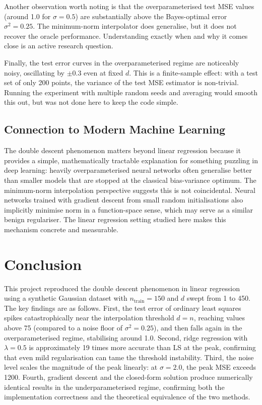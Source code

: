 \documentclass[11pt,a4paper]{article}
\begin{document}
Another observation worth noting is that the overparameterised test MSE values (around 1.0 for $\sigma = 0.5$) are substantially above the Bayes-optimal error $\sigma^2 = 0.25$. The minimum-norm interpolator does generalise, but it does not recover the oracle performance. Understanding exactly when and why it comes close is an active research question.

Finally, the test error curves in the overparameterised regime are noticeably noisy, oscillating by $\pm 0.3$ even at fixed $d$. This is a finite-sample effect: with a test set of only 200 points, the variance of the test MSE estimator is non-trivial. Running the experiment with multiple random seeds and averaging would smooth this out, but was not done here to keep the code simple.

\subsection{Connection to Modern Machine Learning}

The double descent phenomenon matters beyond linear regression because it provides a simple, mathematically tractable explanation for something puzzling in deep learning: heavily overparameterised neural networks often generalise better than smaller models that are stopped at the classical bias-variance optimum. The minimum-norm interpolation perspective suggests this is not coincidental. Neural networks trained with gradient descent from small random initialisations also implicitly minimise norm in a function-space sense, which may serve as a similar benign regulariser. The linear regression setting studied here makes this mechanism concrete and measurable.

\section{Conclusion}
%

This project reproduced the double descent phenomenon in linear regression using a synthetic Gaussian dataset with $n_{\text{train}} = 150$ and $d$ swept from 1 to 450. The key findings are as follows. First, the test error of ordinary least squares spikes catastrophically near the interpolation threshold $d = n$, reaching values above 75 (compared to a noise floor of $\sigma^2 = 0.25$), and then falls again in the overparameterised regime, stabilising around 1.0. Second, ridge regression with $\lambda = 0.5$ is approximately 19 times more accurate than LS at the peak, confirming that even mild regularisation can tame the threshold instability. Third, the noise level scales the magnitude of the peak linearly: at $\sigma = 2.0$, the peak MSE exceeds 1200. Fourth, gradient descent and the closed-form solution produce numerically identical results in the underparameterised regime, confirming both the implementation correctness and the theoretical equivalence of the two methods.
\end{document}
